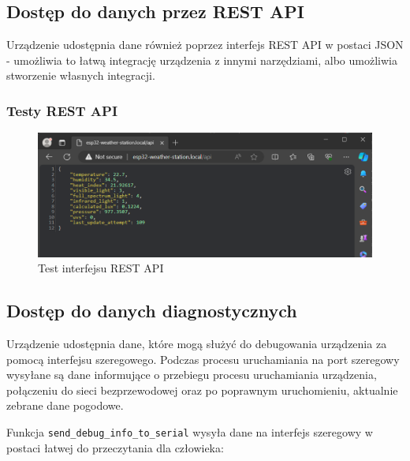 \documentclass[12pt,a4paper]{article}
\begin{document}
\subsection{Dostęp do danych przez REST API}

Urządzenie udostępnia dane również poprzez interfejs REST API w postaci JSON - umożliwia to łatwą integrację urządzenia z innymi narzędziami, albo umożliwia stworzenie własnych integracji.

\subsubsection{Testy REST API}
\begin{figure}[H]
    \centering
    \includegraphics[width=\textwidth]{rest-api.png}
    \caption{Test interfejsu REST API}
\end{figure}

\subsection{Dostęp do danych diagnostycznych}

Urządzenie udostępnia dane, które mogą służyć do debugowania urządzenia za pomocą interfejsu szeregowego. Podczas procesu uruchamiania na port szeregowy wysyłane są dane informujące o przebiegu procesu uruchamiania urządzenia, połączeniu do sieci bezprzewodowej oraz po poprawnym uruchomieniu, aktualnie zebrane dane pogodowe.

Funkcja \texttt{send\_debug\_info\_to\_serial} wysyła dane na interfejs szeregowy w postaci łatwej do przeczytania dla człowieka:
\end{document}
